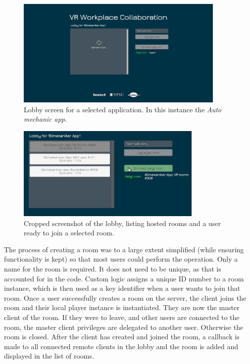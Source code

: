 \begin{figure}[H]
  \centering
   \captionsetup{width=.9\linewidth}
    \includegraphics[width=0.9\textwidth]{fig/phase_3/implementation/Lobby2Fetching.PNG}
 \caption{Lobby screen for a selected application. In this instance the \textit{Auto mechanic app}.}
\label{fig:phase3_LobbyScene1}
\end{figure}

\begin{figure}[H]
  \centering
   \captionsetup{width=.8\linewidth}
    \includegraphics[width=0.8\textwidth]{fig/phase_3/implementation/Lobby2MultiRoomsSelectedSmall.jpg}
 \caption{Cropped screenshot of the lobby, listing hosted rooms and a user ready to join a selected room.}
\label{fig:phase3_LobbyMultiRoomsSelectSmall}
\end{figure}

The process of creating a room was to a large extent simplified (while ensuring functionality is kept) so that most users could perform the operation. Only a name for the room is required. It does not need to be unique, as that is accounted for in the code. Custom logic assigns a unique ID number to a room instance, which is then used as a key identifier when a user wants to join that room. Once a user successfully creates a room on the server, the client joins the room and their local player instance is instantiated. They are now the master client of the room. If they were to leave, and other users are connected to the room, the master client privileges are delegated to another user. Otherwise the room is closed. After the client has created and joined the room, a callback is made to all connected remote clients in the lobby and the room is added and displayed in the list of rooms. 

